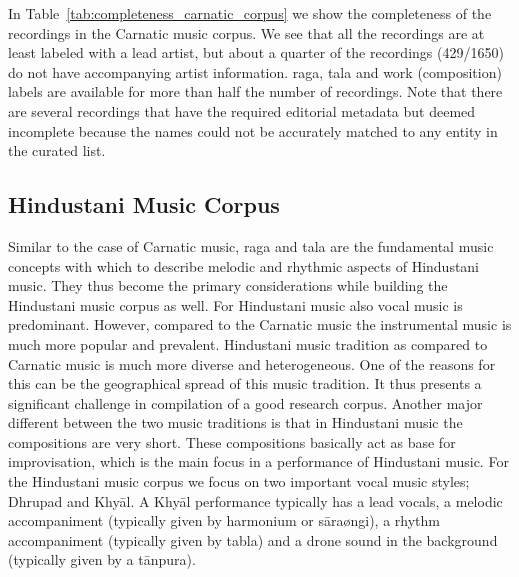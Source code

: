 In Table~\ref{tab:completeness_carnatic_corpus} we show the completeness of the recordings in the Carnatic music corpus. We see that all the recordings are at least labeled with a lead artist, but about a quarter of the recordings (429/1650) do not have accompanying artist information. \Gls{raga}, \gls{tala} and work (composition) labels are available for more than half the number of recordings. Note that there are several recordings that have the required editorial metadata but deemed incomplete because the names could not be accurately matched to any entity in the curated list. 


  
%


\subsection{Hindustani Music Corpus}
\label{sec:corpus_hindustani_music_corpus}

Similar to the case of Carnatic music, \gls{raga} and \gls{tala} are the fundamental music concepts with which to describe melodic and rhythmic aspects of Hindustani music. They thus become the primary considerations while building the Hindustani music corpus as well. For Hindustani music also vocal music is predominant. However, compared to the Carnatic music the instrumental music is much more popular and prevalent. Hindustani music tradition as compared to Carnatic music is much more diverse and heterogeneous. One of the reasons for this can be the geographical spread of this music tradition. It thus presents a significant challenge in compilation of a good research corpus. Another major different between the two music traditions is that in Hindustani music the compositions are very short. These compositions basically act as base for improvisation, which is the main focus in a performance of Hindustani music. For the Hindustani music corpus we focus on two important vocal music styles; Dhrupad and Khy\={a}l. A Khy\={a}l performance typically has a lead vocals, a melodic accompaniment (typically given by harmonium or s\={a}ra\o{n}gi), a rhythm accompaniment (typically given by tabla) and a drone sound in the background (typically given by a t\={a}npura). 

